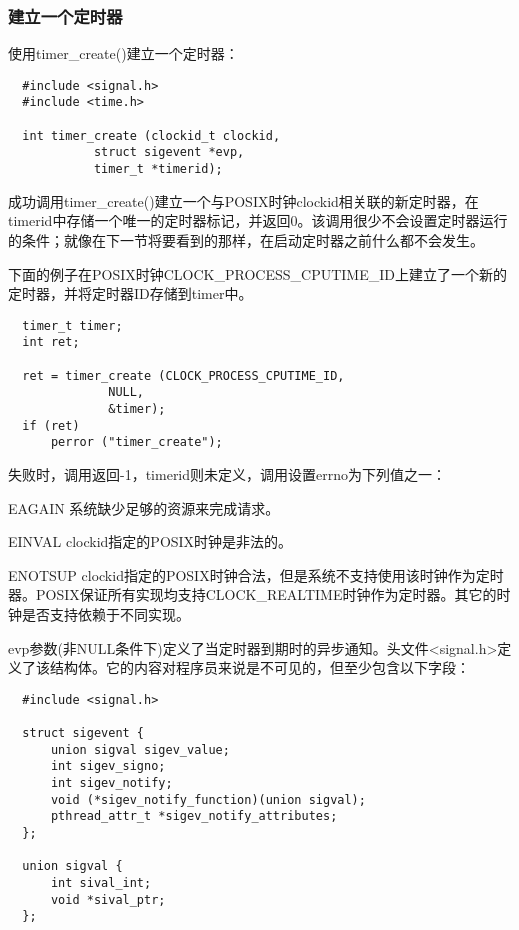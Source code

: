 \subsubsection{建立一个定时器}

使用timer\_create()建立一个定时器： 

\begin{lstlisting}
  #include <signal.h>
  #include <time.h>

  int timer_create (clockid_t clockid,
		    struct sigevent *evp,
		    timer_t *timerid);
\end{lstlisting}

成功调用timer\_create()建立一个与POSIX时钟clockid相关联的新定时器，在timerid中存储一个唯一的定时器标记，并返回0。该调用很少不会设置定时器运行的条件；就像在下一节将要看到的那样，在启动定时器之前什么都不会发生。 

下面的例子在POSIX时钟CLOCK\_PROCESS\_CPUTIME\_ID上建立了一个新的定时器，并将定时器ID存储到timer中。 

\begin{lstlisting}
  timer_t timer;
  int ret;

  ret = timer_create (CLOCK_PROCESS_CPUTIME_ID,
		      NULL,
		      &timer);
  if (ret)
      perror ("timer_create");
\end{lstlisting}

失败时，调用返回-1，timerid则未定义，调用设置errno为下列值之一：

\begin{eqlist*}
\item [EAGAIN]
系统缺少足够的资源来完成请求。 
\item [EINVAL]
clockid指定的POSIX时钟是非法的。
 \item [ENOTSUP]
clockid指定的POSIX时钟合法，但是系统不支持使用该时钟作为定时器。POSIX保证所有实现均支持CLOCK\_REALTIME时钟作为定时器。其它的时钟是否支持依赖于不同实现。 
\end{eqlist*}

evp参数(非NULL条件下)定义了当定时器到期时的异步通知。头文件<signal.h>定义了该结构体。它的内容对程序员来说是不可见的，但至少包含以下字段： 

\begin{lstlisting}
  #include <signal.h>

  struct sigevent {
      union sigval sigev_value;
      int sigev_signo;
      int sigev_notify;
      void (*sigev_notify_function)(union sigval);
      pthread_attr_t *sigev_notify_attributes;
  };

  union sigval {
      int sival_int;
      void *sival_ptr;
  };
\end{lstlisting}


